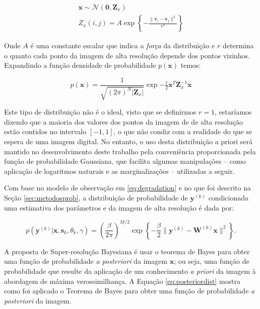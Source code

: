 \begin{gather}
	\mathbf{x} \sim \mathcal{N}(\mathbf{0}, \mathbf{Z}_x) \\ 
	\label{eq:covmat} Z_x(i,j) = A \exp \left\{ - \frac{\|\mathbf{v}_i - \mathbf{v}_j \|^2}{r^2} \right\}
\end{gather}

Onde $A$ é uma constante escalar que indica a \emph{força} da distribuição e $r$ determina o quanto cada ponto da imagem de alta resolução depende dos pontos vizinhos.
Expandindo a função densidade de probabilidade $p(\mathbf{x})$ temos:

\begin{equation}
	\label{eq:priordist}
	p(\mathbf{x}) = \frac{1}{\sqrt{(2\pi)^N |\mathbf{Z}_x|}}\exp{-\tfrac{1}{2} \mathbf{x}^T \mathbf{Z}^{-1}_x \mathbf{x}}
\end{equation}

Este tipo de distribuição não é o ideal, visto que se definirmos $r=1$, estaríamos dizendo que a maioria dos valores dos pontos da imagem de de alta resolução estão contidos no intervalo $[-1,1]$, o que não condiz com a realidade do que se espera de uma imagem digital.
No entanto, o uso desta distribuição a priori será mantido no desenvolvimento deste
trabalho pela conveniência proporcionada pela função de probabilidade Gaussiana, que
facilita algumas manipulações -- como aplicação de logaritmos naturais e as marginalizações --  utilizadas a seguir.

Com base no modelo de observação em \ref{eq:degradation} e no que foi descrito na Seção \ref{sec:metodosprob}, a distribuição de probabilidade de $\mathbf{y}^{(k)}$ condicionada uma estimativa dos parâmetros e da imagem de alta resolução é dada por:

\begin{equation}
	\label{eq:likelihood0}
	p(\mathbf{y}^{(k)} | \mathbf{x}, \mathbf{s}_k, \theta_k, \gamma) = 
	\left(\frac{\beta}{2\pi}\right)^{M/2}
	\exp \left\{ -\frac{\beta}{2} \| \mathbf{y}^{(k)} - \mathbf{W}^{(k)} \mathbf{x} \|^2 \right\}.
\end{equation}


A proposta de Super-resolução Bayesiana é usar o teorema de Bayes para obter uma função
de probabilidade \emph{a posteriori} da imagem $\mathbf{x}$; ou seja, uma função de
probabilidade que resulte da aplicação de um conhecimento \emph{a priori} da imagem à
abordagem de máxima verossimilhança. A Equação \ref{eq:posteriordist} mostra como foi aplicado o Teorema de Bayes para obter uma função de probabilidade \emph{a posteriori} da imagem.

